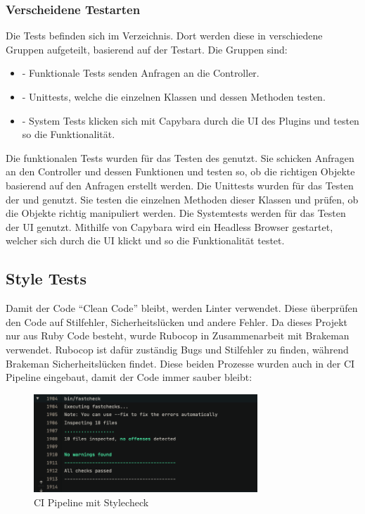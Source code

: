 \subsubsection{Verscheidene Testarten}
Die Tests befinden sich im  Verzeichnis. Dort werden diese in verschiedene
Gruppen aufgeteilt, basierend auf der Testart. Die Gruppen sind:
\begin{itemize}
    \item {} - Funktionale Tests senden Anfragen an die Controller.
    \item {} - Unittests, welche die einzelnen Klassen und dessen Methoden
    testen.
    \item {} - System Tests klicken sich mit Capybara durch die UI des
    Plugins und testen so die Funktionalität.
\end{itemize}
Die funktionalen Tests wurden für das Testen des 
genutzt. Sie schicken Anfragen an den Controller und dessen Funktionen und testen so, ob die richtigen
Objekte basierend auf den Anfragen erstellt werden. \newline
Die Unittests wurden für das Testen der  und 
 genutzt. Sie testen die einzelnen Methoden dieser Klassen und
prüfen, ob die Objekte richtig manipuliert werden. \newline
Die Systemtests werden für das Testen der UI genutzt. Mithilfe von Capybara wird ein Headless Browser
gestartet, welcher sich durch die UI klickt und so die Funktionalität testet.
\subsection{Style Tests}
Damit der Code \enquote{Clean Code} bleibt, werden Linter verwendet. Diese überprüfen den Code auf Stilfehler,
Sicherheitslücken und andere Fehler. \newline
Da dieses Projekt nur aus Ruby Code besteht, wurde Rubocop in Zusammenarbeit mit Brakeman verwendet. Rubocop
ist dafür zuständig Bugs und Stilfehler zu finden, während Brakeman Sicherheitslücken findet. Diese beiden
Prozesse wurden auch in der CI Pipeline eingebaut, damit der Code immer sauber bleibt:
\begin{figure}[H]
    \centering
    \includegraphics[width=0.75\textwidth]{images/misc/stylecheck_ci.png}
    \caption[Eine Grafik der CI Pipeline mit dem Stylecheck]{CI Pipeline mit Stylecheck}
    \label{fig:ci_pipeline}
\end{figure}

